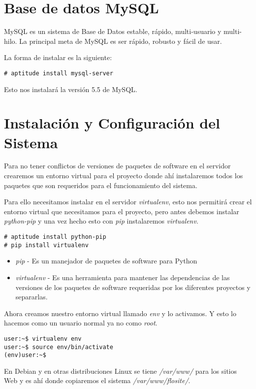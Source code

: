 \section{Base de datos MySQL}
MySQL es un sistema de Base de Datos estable, rápido, multi-usuario y multi-hilo.
La principal meta de MySQL es ser rápido, robusto y fácil de usar.

La forma de instalar es la siguiente:

\begin{verbatim}
# aptitude install mysql-server
\end{verbatim}

Esto nos instalará la versión 5.5 de MySQL.

\section{Instalación y Configuración del Sistema}
Para no tener conflictos de versiones de paquetes de software en el servidor
crearemos un entorno virtual para el proyecto donde ahí instalaremos todos los
paquetes que son requeridos para el funcionamiento del sistema.

Para ello necesitamos instalar en el servidor {\it virtualenv}, esto nos permitirá
crear el entorno virtual que necesitamos para el proyecto, pero antes debemos
instalar {\it python-pip} y una vez hecho esto con {\it pip} instalaremos
{\it virtualenv}.

\begin{verbatim}
# aptitude install python-pip
# pip install virtualenv
\end{verbatim}

\begin{itemize}
  \item {\it pip} - Es un manejador de paquetes de software para Python
  \item {\it virtualenv} - Es una herramienta para mantener las dependencias
    de las versiones de los paquetes de software requeridas por los diferentes
    proyectos y separarlas.
\end{itemize}

Ahora creamos nuestro entorno virtual llamado {\it env} y lo activamos. Y esto
lo hacemos como un usuario normal ya no como {\it root}.

\begin{verbatim}
user:~$ virtualenv env
user:~$ source env/bin/activate
(env)user:~$
\end{verbatim}

En Debian y en otras distribuciones Linux se tiene {\it /var/www/} para los sitios
Web y es ahí donde copiaremos el sistema {\it /var/www/flosite/}.

